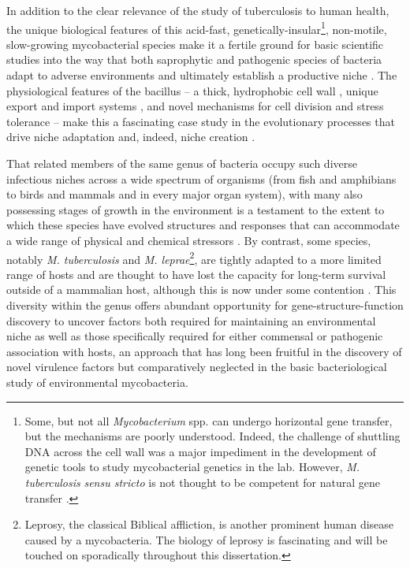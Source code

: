 In addition to the clear relevance of the study of tuberculosis to human health, the unique biological features of this acid\hyp{}fast, genetically\hyp{}insular\footnote{Some, but not all \textit{Mycobacterium} spp. can undergo horizontal gene transfer, but the mechanisms are poorly understood. Indeed, the challenge of shuttling DNA across the cell wall was a major impediment in the development of genetic tools to study mycobacterial genetics in the lab. However, \textit{M. tuberculosis} \textit{sensu stricto} is not thought to be competent for natural gene transfer \citep{Madacki2021, Reva2015, Merker2015, Galagan2014, Boritsch2016, Derbyshire2014, Krzywinska2004}.}, non\hyp{}motile, slow\hyp{}growing mycobacterial species make it a fertile ground for basic scientific studies into the way that both saprophytic and pathogenic species of bacteria adapt to adverse environments and ultimately establish a productive niche \citep{Prasanthi2014, Falkinham2009, Ghodbane2014, Houben2006, Pieters2002, Delafont2014}. The physiological features of the bacillus -- a thick, hydrophobic cell wall \citep{Chatterjee1997, Jarlier1994, Jankute2015}, unique export and import systems \citep{Houben2014, Bunduc2020, Famelis2019, Pandey2008, Tullius2011, Braibant2000, Wong2017a, Palmer2017}, and novel mechanisms for cell division \citep{Hett2008, Odermatt2020, Dziadek2003, Kieser2014} and stress tolerance \citep{Garg2015, Peddireddy2017} -- make this a fascinating case study in the evolutionary processes that drive niche adaptation and, indeed, niche creation \citep{Lovewell2021, Honda2018, Lerner2016, Gengenbacher2012, Sarathy2020, Warner2007, Chapman1971, deChastellier2009, Gagneux2018, Pereira2020}. 

That related members of the same genus of bacteria occupy such diverse infectious niches across a wide spectrum of organisms (from fish and amphibians to birds and mammals and in every major organ system), with many also possessing stages of growth in the environment is a testament to the extent to which these species have evolved structures and responses that can accommodate a wide range of physical and chemical stressors \citep{Thoen1981, Palmer2011, Hershberg2016, Saelens2019, Larsen2020}. By contrast, some species, notably \textit{M. tuberculosis} and \textit{M. leprae}\footnote{Leprosy, the classical Biblical affliction, is another prominent human disease caused by a mycobacteria. The biology of leprosy is fascinating and will be touched on sporadically throughout this dissertation.}, are tightly adapted to a more limited range of hosts and are thought to have lost the capacity for long\hyp{}term survival outside of a mammalian host, although this is now under some contention \citep{Ploemacher2020, Borham2022, Martinez2019, Mtetwa2022}. This diversity within the genus offers abundant opportunity for gene\hyp{}structure\hyp{}function discovery to uncover factors both required for maintaining an environmental niche as well as those specifically required for either commensal or pathogenic association with hosts, an approach that has long been fruitful in the discovery of novel virulence factors \citep{Sassetti2003, Ehrt2015} but comparatively neglected in the basic bacteriological study of environmental mycobacteria.

